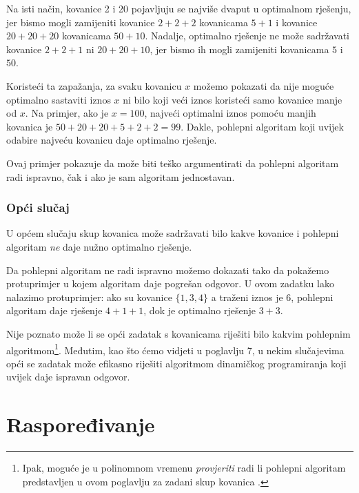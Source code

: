 Na isti način, kovanice 2 i 20 pojavljuju se
najviše dvaput u optimalnom rješenju,
jer bismo mogli zamijeniti
kovanice $2+2+2$ kovanicama $5+1$ i
kovanice $20+20+20$ kovanicama $50+10$.
Nadalje, optimalno rješenje ne može sadržavati
kovanice $2+2+1$ ni $20+20+10$,
jer bismo ih mogli zamijeniti kovanicama $5$ i $50$.

Koristeći ta zapažanja,
za svaku kovanicu $x$ možemo pokazati da
nije moguće optimalno sastaviti
iznos $x$ ni bilo koji veći iznos koristeći samo kovanice
manje od $x$.
Na primjer, ako je $x=100$, najveći optimalni
iznos pomoću manjih kovanica je  $50+20+20+5+2+2=99$.
Dakle, pohlepni algoritam koji uvijek odabire
najveću kovanicu daje optimalno rješenje.

Ovaj primjer pokazuje da može biti teško
argumentirati da pohlepni algoritam radi ispravno,
čak i ako je sam algoritam jednostavan.

\subsubsection{Opći slučaj}

U općem slučaju skup kovanica može sadržavati bilo kakve kovanice
i pohlepni algoritam \emph{ne} daje nužno
optimalno rješenje.

Da pohlepni algoritam ne radi ispravno možemo dokazati
tako da pokažemo protuprimjer
u kojem algoritam daje pogrešan odgovor.
U ovom zadatku lako nalazimo protuprimjer:
ako su kovanice $\{1,3,4\}$ a traženi iznos
je 6, pohlepni algoritam daje rješenje
$4+1+1$, dok je optimalno rješenje $3+3$.

Nije poznato može li se opći zadatak s kovanicama
riješiti bilo kakvim pohlepnim algoritmom\footnote{Ipak, moguće je
u polinomnom vremenu \emph{provjeriti}
radi li pohlepni algoritam predstavljen u ovom poglavlju za
zadani skup kovanica \cite{pea05}.}.
Međutim, kao što ćemo vidjeti u poglavlju 7,
u nekim slučajevima
opći se zadatak može efikasno
riješiti algoritmom dinamičkog
programiranja koji uvijek daje
ispravan odgovor.

\section{Raspoređivanje}

